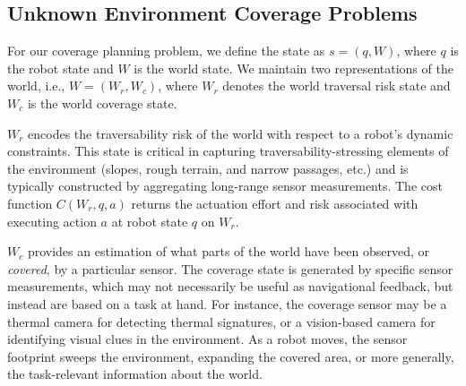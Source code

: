 \documentclass[letterpaper]{article} %
\newcommand{\phdone}[1]{} %
\begin{document}
\subsection{Unknown Environment Coverage Problems}

\phdone{Coverage Problem}
For our coverage planning problem, we define the state as $s = (q, W)$, where $q$ is the robot state and $W$ is the world state. We maintain two representations of the world, i.e., $W = (W_{r}, W_{c})$, where $W_{r}$ denotes the world traversal risk state and $W_{c}$ is the world coverage state.

$W_{r}$ encodes the traversability risk of the world with respect to a robot's dynamic constraints. This state is critical in capturing traversability-stressing elements of the environment (slopes, rough terrain, and narrow passages, etc.) and is typically constructed by aggregating long-range sensor measurements. %
The cost function $C(W_{r}, q, a)$ returns the actuation effort and risk associated with executing action $a$ at robot state $q$ on $W_{r}$.

$W_{c}$ provides an estimation of what parts of the world have been observed, or \textit{covered}, by a particular sensor.
The coverage state is generated by specific sensor measurements, which may not necessarily be useful as navigational feedback, but instead are based on a task at hand. For instance, the coverage sensor may be a thermal camera for detecting thermal signatures, or a vision-based camera for identifying visual clues in the environment. 
As a robot moves, the sensor footprint sweeps the environment, expanding the covered area, or more generally, the task-relevant information about the world.
\end{document}
